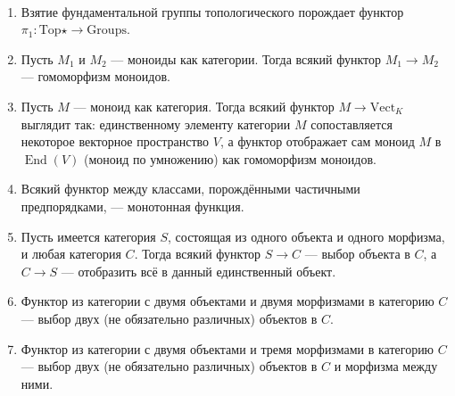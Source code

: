 \documentclass[12pt,a4paper]{article}
\DeclareMathOperator{\End}{End}
\newcommand{\Groups}{\mathrm{Groups}}
\newcommand{\Vect}{\mathrm{Vect}}
\newcommand{\Top}{\mathrm{Top}}
\begin{document}
    \begin{example}\ 
        \begin{enumerate}
            \item Взятие фундаментальной группы топологического порождает функтор $\pi_1: \Top\star \to \Groups$.
            \item Пусть $M_1$ и $M_2$ --- моноиды как категории. Тогда всякий функтор $M_1 \to M_2$ --- гомоморфизм моноидов.
            \item Пусть $M$ --- моноид как категория. Тогда всякий функтор $M \to \Vect_K$ выглядит так: единственному элементу категории $M$ сопоставляется некоторое векторное пространство $V$, а функтор отображает сам моноид $M$ в $\End(V)$ (моноид по умножению) как гомоморфизм моноидов.
            \item Всякий функтор между классами, порождёнными частичными предпорядками, --- монотонная функция.
            \item Пусть имеется категория $S$, состоящая из одного объекта и одного морфизма, и любая категория $C$. Тогда всякий функтор $S \to C$ --- выбор объекта в $C$, а $C \to S$ --- отобразить всё в данный единственный объект.
            \item Функтор из категории с двумя объектами и двумя морфизмами в категорию $C$ --- выбор двух (не обязательно различных) объектов в $C$.
            \item Функтор из категории с двумя объектами и тремя морфизмами в категорию $C$ --- выбор двух (не обязательно различных) объектов в $C$ и морфизма между ними.
        \end{enumerate}
    \end{example}
\end{document}
